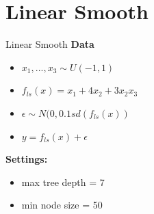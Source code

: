 \documentclass[9pt, xcolor=table]{beamer}
\begin{document}
\section{Linear Smooth}
\begin{frame}{Linear Smooth}
\textbf{Data}
\begin{itemize}
    \item $x_1,..., x_3 \sim U(-1,1)$ 
    \item $ f_{ls}(x) = x_1 + 4   x_2 + 3   x_2   x_3 $
    \item $\epsilon \sim N(0, 0.1 sd(f_{ls}(x))$
    \item $y = f_{ls}(x) + \epsilon$
\end{itemize}

\textbf{Settings:}
\begin{itemize}
    \item max tree depth = 7 
    \item min node size = 50    
\end{itemize}

\end{frame}
\end{document}
